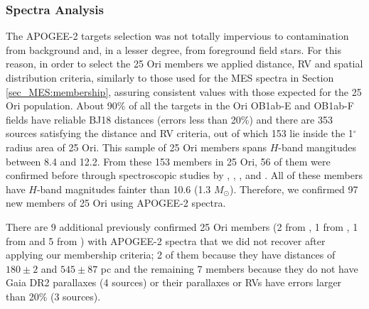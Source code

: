 \documentclass[12pt]{article}
\newcounter{subsubsubsection}[subsubsection]
\begin{document}
\subsubsection{Spectra Analysis}
\label{sec_APOGEE-2:analysis}

\label{sec_APOGEE-2:memberships}
The APOGEE-2 targets selection was not totally impervious to contamination from background and, in a lesser degree, from foreground field stars. For this reason, in order to select the 25 Ori members we applied distance, RV and spatial distribution criteria, similarly to those used for the MES spectra in Section \ref{sec_MES:membership}, assuring consistent values with those expected for the 25 Ori population. About 90\% of all the targets in the Ori OB1ab-E and OB1ab-F fields have reliable BJ18 distances (errors less than 20\%) and there are 353 sources satisfying the distance and RV criteria, out of which 153 lie inside the 1$^\circ$ radius area of 25 Ori. This sample of 25 Ori members spans $H$-band mangitudes between 8.4 and 12.2. From these 153 members in 25 Ori, 56 of them were confirmed before through spectroscopic studies by \citet[18 sources; ][]{Briceno2005}, \citet[9 sources; ][]{Briceno2007}, \citet[8 sources; ][]{Downes2014}, \citet[3 sources; ][]{Suarez2017} and \citet[18 sources; ][]{Briceno2018}. All of these members have $H$-band magnitudes fainter than 10.6 (1.3 $M_\odot$). Therefore, we confirmed 97 new members of 25 Ori using APOGEE-2 spectra.

There are 9 additional previously confirmed 25 Ori members (2 from \citealt{Briceno2005}, 1 from \citealt{Briceno2007}, 1 from \citealt{Downes2014} and 5 from \citealt{Briceno2018}) with APOGEE-2 spectra that we did not recover after applying our membership criteria; 2 of them because they have distances of $180\pm2$ and $545\pm87$ pc and the remaining 7 members because they do not have Gaia DR2 parallaxes (4 sources) or their parallaxes or RVs have errors larger than 20\% (3 sources).
\end{document}
